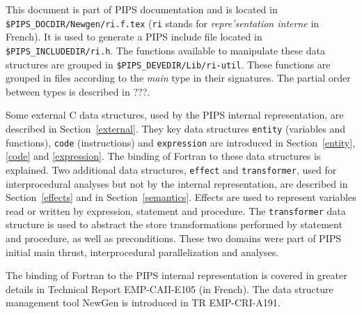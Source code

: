 This document is part of PIPS documentation and is located in
\verb+$PIPS_DOCDIR/Newgen/ri.f.tex+ (\verb+ri+ stands for {\em
repre'sentation interne} in French). It is used to generate a PIPS
include file located in \verb+$PIPS_INCLUDEDIR/ri.h+. The functions
available to manipulate these data structures are grouped in
\verb+$PIPS_DEVEDIR/Lib/ri-util+. These functions are grouped in files
according to the {\em main} type in their signatures. The partial order
between types is described in ???.

\iffalse
Ce document est utilise' directement et automatiquement par l'outil
de ge'nie logiciel NewGen pour ge'ne'rer les de'clarations des structures
de donne'es utilise'es dans le projet PIPS, ainsi que les routines de
base qui les manipulent. C'est pourquoi l'ordre des sections n'est pas
ne'cessairement naturel.
\fi

Some external C data structures, used by the PIPS internal
representation, are described in Section~\ref{external}. They key data
structures \verb+entity+ (variables and functions), \verb+code+
(instructions) and \verb+expression+ are introduced in
Section~\ref{entity}, \ref{code} and \ref{expression}. The binding of
Fortran to these data structures is explained. Two additional data
structures, \verb+effect+ and \verb+transformer+, used for
interprocedural analyses but not by the internal representation, are
described in Section~\ref{effects} and in
Section~\ref{semantics}. Effects are used to represent variables read or
written by expression, statement and procedure. The \verb+transformer+
data structure is used to abstract the store transformations performed
by statement and procedure, as well as preconditions. These two domains
were part of PIPS initial main thrust, interprocedural parallelization
and analyses. 

\iffalse
Apre`s une description rapide des structures de donne'es externes a` la
repre'sentation interne de PIPS, nous pre'sentons successivement les
notions d'entite's, de code et d'expressions et la manie`re dont elles
sont utilise'es pour encoder un programme Fortran. Nous de'taillons
ensuite deux structures de donne'es supple'mentaires, les effets et les
{\em transformers} qui sont utilise's pour le calcul de de'pendance
interproce'dural et pour l'analyse syntaxique interproce'durale.
\fi

The binding of Fortran to the PIPS internal representation is covered in
greater details in Technical Report EMP-CAII-E105 (in French). The data
structure management tool NewGen is introduced in TR EMP-CRI-A191.

